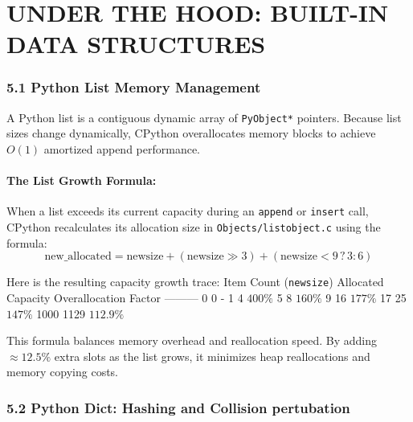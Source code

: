 \hypertarget{under-the-hood-built-in-data-structures}{%
\chapter{UNDER THE HOOD: BUILT-IN DATA
STRUCTURES}\label{under-the-hood-built-in-data-structures}}

\hypertarget{python-list-memory-management}{%
\subsection{5.1 Python List Memory
Management}\label{python-list-memory-management}}

A Python list is a contiguous dynamic array of
\passthrough{\lstinline!PyObject*!} pointers. Because list sizes change
dynamically, CPython overallocates memory blocks to achieve \(O(1)\)
amortized append performance.

\hypertarget{the-list-growth-formula}{%
\subsubsection{The List Growth Formula:}\label{the-list-growth-formula}}

When a list exceeds its current capacity during an
\passthrough{\lstinline!append!} or \passthrough{\lstinline!insert!}
call, CPython recalculates its allocation size in
\passthrough{\lstinline!Objects/listobject.c!} using the formula:
\[\text{new\_allocated} = \text{newsize} + (\text{newsize} \gg 3) + (\text{newsize} < 9 \,?\, 3 : 6)\]

Here is the resulting capacity growth trace: \textbar{} Item Count
(\passthrough{\lstinline!newsize!}) \textbar{} Allocated Capacity
\textbar{} Overallocation Factor \textbar{}
\textbar---\textbar---\textbar---\textbar{} \textbar{} 0 \textbar{} 0
\textbar{} - \textbar{} \textbar{} 1 \textbar{} 4 \textbar{} \(400\%\)
\textbar{} \textbar{} 5 \textbar{} 8 \textbar{} \(160\%\) \textbar{}
\textbar{} 9 \textbar{} 16 \textbar{} \(177\%\) \textbar{} \textbar{} 17
\textbar{} 25 \textbar{} \(147\%\) \textbar{} \textbar{} 1000 \textbar{}
1129 \textbar{} \(112.9\%\) \textbar{}

This formula balances memory overhead and reallocation speed. By adding
\(\approx 12.5\%\) extra slots as the list grows, it minimizes heap
reallocations and memory copying costs.

\hypertarget{python-dict-hashing-and-collision-pertubation}{%
\subsection{5.2 Python Dict: Hashing and Collision
pertubation}\label{python-dict-hashing-and-collision-pertubation}}

